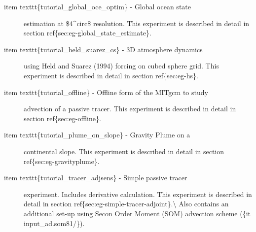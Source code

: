 \documentclass[letterpaper,10pt,english]{sphinxmanual}
\begin{document}
\begin{description}
\item[{item texttt\{tutorial\_global\_oce\_optim\} - Global ocean state}] \leavevmode
estimation at \$4\textasciicircum{}circ\$ resolution.  This experiment is described in
detail in section ref\{sec:eg-global\_state\_estimate\}.

\item[{item texttt\{tutorial\_held\_suarez\_cs\} - 3D atmosphere dynamics}] \leavevmode
using Held and Suarez (1994) forcing on cubed sphere grid.  This
experiment is described in detail in section ref\{sec:eg-hs\}.

\item[{item texttt\{tutorial\_offline\} - Offline form of the MITgcm to study}] \leavevmode
advection of a passive tracer.  This experiment is described in
detail in section ref\{sec:eg-offline\}.

\item[{item texttt\{tutorial\_plume\_on\_slope\} - Gravity Plume on a}] \leavevmode
continental slope.  This experiment is described in detail in
section ref\{sec:eg-gravityplume\}.

\item[{item texttt\{tutorial\_tracer\_adjsens\} - Simple passive tracer}] \leavevmode
experiment. Includes derivative calculation. This experiment is
described in detail in section ref\{sec:eg-simple-tracer-adjoint\}.\textbackslash{}
Also contains an additional set-up using Secon Order Moment (SOM) advection
scheme (\{it input\_ad.som81/\}).

\end{description}
\end{document}
